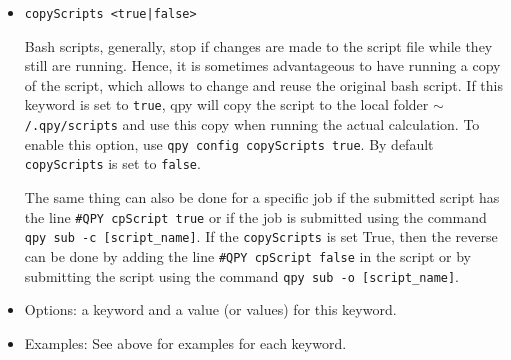 \documentclass[a4paper,12pt]{article}
\begin{document}
\begin{itemize}
  \begin{lstlisting}[style=BashStyle]
+\$+ qpy check
100 (running):bash my_script.sh (on comp1; wd: /home/users/)
+\$+ qpy config checkFMT '%j: %s\n'
Check pattern modified to '%j: %s\n'
+\$+ qpy check
100: running
+\$+ qpy config checkFMT '%j (%s)\n\tSubmitted from %d\n\tStarted at %S\n-----\n'
Check pattern modified to '%j (%s)\n\tSubmitted from %d\n\tStarted at %S\n-----\n'
+\$+ qpy check
100 (running)
        Submitted from /home/users/
        Started at 2018-10-04 18:01:45.948201
-----
+\$+ qpy config checkFMT default
Check pattern restored to the default value: '%j (%s):%c (on %n; wd: %d)\n'.
+\$+ qpy check
100 (running):bash my_script.sh (on comp1; wd: /home/users/)
  \end{lstlisting}

  The \texttt{\textbackslash n} is important, and it means ``new line''.
  Without it, all jobs are printed in the same line.
  One can also use \texttt{\textbackslash t} to insert a tabulation, as the example shows.

\item \texttt{copyScripts <true|false>}

  Bash scripts, generally, stop if changes are made to the script file while they still are running.
  Hence, it is sometimes advantageous to have \qpy{} running a copy of the script, which allows to change and reuse the original bash script.
  If this keyword is set to \texttt{true}, qpy will copy the script to the local folder \texttt{$\sim$/.qpy/scripts} and use this copy when running the actual calculation.
  To enable this option, use \texttt{qpy config copyScripts true}. By default \texttt{copyScripts} is set to \texttt{false}. 
  
  The same thing can also be done for a specific job if the submitted script has the line \texttt{\#QPY cpScript true} or if the job is submitted using the command \texttt{qpy sub -c [script\_name]}.
  If the \texttt{copyScripts} is set True, then the reverse can be done by adding the line \texttt{\#QPY cpScript false} in the script or by submitting the script using the command \texttt{qpy sub -o [script\_name]}.
  
\end{itemize}

\begin{itemize}

\item Options: a keyword and a value (or values) for this keyword.

\item Examples: See above for examples for each keyword.

\end{itemize}
\end{document}
